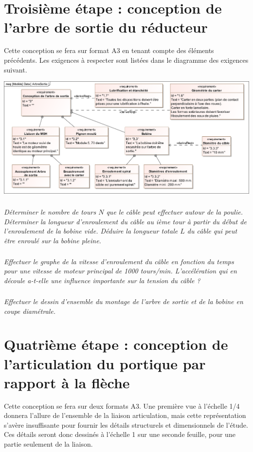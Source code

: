 \documentclass[10pt]{article}
\begin{document}
\section{Troisième étape : conception de l'arbre de sortie du réducteur}

Cette conception se fera sur format A3 en tenant compte des éléments précédents. Les exigences à respecter sont listées dans le diagramme des exigences suivant. 

\begin{center}
\includegraphics[width=\textwidth]{images/SysML/ArbreSortie}
\end{center}




\subparagraph{}
\textit{Déterminer le nombre de tours $N$ que le câble peut effectuer autour de la poulie. 
Déterminer la longueur d'enroulement du câble au ième tour à partir du début de l'enroulement de la bobine vide.
Déduire la longueur totale $L$ du câble qui peut être enroulé sur la bobine pleine.}

\subparagraph{}
\textit{Effectuer le graphe de la vitesse d'enroulement du câble en fonction du temps pour une vitesse de moteur principal de 1000 tours/min.
L'accélération qui en découle a-t-elle une influence importante sur la tension du câble ?}

\subparagraph{}
\textit{Effectuer le dessin d'ensemble du montage de l'arbre de sortie et de la bobine en coupe diamétrale.}


\section{Quatrième étape :  conception de l'articulation du portique par rapport à la flèche}

Cette conception se fera sur deux formats A3. Une première vue à l'échelle 1/4 donnera l'allure de l'ensemble de la liaison articulation, mais cette représentation s'avère insuffisante pour fournir les détails structurels et dimensionnels de l'étude. Ces détails seront donc dessinés à l'échelle 1 sur une seconde feuille, pour une partie seulement de la liaison. 
\end{document}
